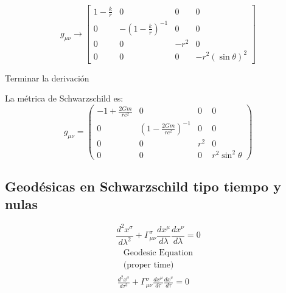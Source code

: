 \begin{equation}
    g_{\mu \nu} \rightarrow\left[\begin{array}{cccc}
            1-\frac{k}{r} & 0                                & 0    & 0                   \\
            0             & -\left(1-\frac{k}{r}\right)^{-1} & 0    & 0                   \\
            0             & 0                                & -r^2 & 0                   \\
            0             & 0                                & 0    & -r^2(\sin \theta)^2
        \end{array}\right]
\end{equation}

\begin{task}{}{}
    Terminar la derivación
\end{task}
La métrica de Schwarzschild es:
\begin{equation}
    \boxed{g_{\mu \nu}=\left(\begin{array}{cccc}
                -1+\frac{2 G m}{r c^2} & 0                                       & 0   & 0                  \\
                0                      & \left(1-\frac{2 G m}{r c^2}\right)^{-1} & 0   & 0                  \\
                0                      & 0                                       & r^2 & 0                  \\
                0                      & 0                                       & 0   & r^2 \sin ^2 \theta
            \end{array}\right)}
\end{equation}
\subsection{Geodésicas en Schwarzschild tipo tiempo y nulas}
\begin{equation}
    \frac{d^2 x^\sigma}{d \lambda^2}+\Gamma_{\mu \nu}^\sigma \frac{d x^\mu}{d \lambda} \frac{d x^\nu}{d \lambda}=0
\end{equation}
\begin{equation}
    \begin{array}{c}
        \begin{array}{c}
            \text { Geodesic Equation } \\
            \text { (proper time) }
        \end{array} \\
        \frac{d^2 x^\sigma}{d \tau^2}+\Gamma_{\mu \nu}^\sigma \frac{d x^\mu}{d \tau} \frac{d x^v}{d \tau}=0
    \end{array}
\end{equation}

